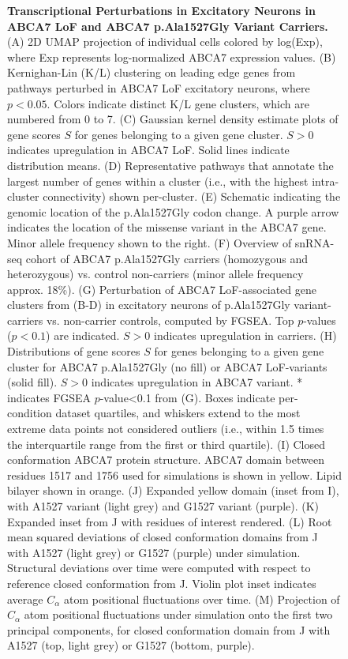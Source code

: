\begin{figure}[ht]
    \centering
    \caption{
        \textbf{Transcriptional Perturbations in Excitatory Neurons in ABCA7 LoF and ABCA7 p.Ala1527Gly Variant Carriers.}\\[1ex]
        (A) 2D UMAP projection of individual cells colored by log(Exp), where Exp represents log-normalized ABCA7 expression values. 
        (B) Kernighan-Lin (K/L) clustering on leading edge genes from pathways perturbed in ABCA7 LoF excitatory neurons, where $p<0.05$. Colors indicate distinct K/L gene clusters, which are numbered from 0 to 7. 
        (C) Gaussian kernel density estimate plots of gene scores $S$ for genes belonging to a given gene cluster. $S>0$ indicates upregulation in ABCA7 LoF. Solid lines indicate distribution means. 
        (D) Representative pathways that annotate the largest number of genes within a cluster (i.e., with the highest intra-cluster connectivity) shown per-cluster. 
        (E) Schematic indicating the genomic location of the p.Ala1527Gly codon change. A purple arrow indicates the location of the missense variant in the ABCA7 gene. Minor allele frequency shown to the right. 
        (F) Overview of snRNA-seq cohort of ABCA7 p.Ala1527Gly carriers (homozygous and heterozygous) vs. control non-carriers (minor allele frequency approx. 18\%). 
        (G) Perturbation of ABCA7 LoF-associated gene clusters from (B-D) in excitatory neurons of p.Ala1527Gly variant-carriers vs. non-carrier controls, computed by FGSEA. Top $p$-values ($p<0.1$) are indicated. $S>0$ indicates upregulation in carriers. 
        (H) Distributions of gene scores $S$ for genes belonging to a given gene cluster for ABCA7 p.Ala1527Gly (no fill) or ABCA7 LoF-variants (solid fill). $S>0$ indicates upregulation in ABCA7 variant. * indicates FGSEA $p$-value<0.1 from (G). Boxes indicate per-condition dataset quartiles, and whiskers extend to the most extreme data points not considered outliers (i.e., within 1.5 times the interquartile range from the first or third quartile). 
        (I) Closed conformation ABCA7 protein structure. ABCA7 domain between residues 1517 and 1756 used for simulations is shown in yellow. Lipid bilayer shown in orange. 
        (J) Expanded yellow domain (inset from I), with A1527 variant (light grey) and G1527 variant (purple). 
        (K) Expanded inset from J with residues of interest rendered. 
        (L) Root mean squared deviations of closed conformation domains from J with A1527 (light grey) or G1527 (purple) under simulation. Structural deviations over time were computed with respect to reference closed conformation from J. Violin plot inset indicates average $C_\alpha$ atom positional fluctuations over time. 
        (M) Projection of $C_\alpha$ atom positional fluctuations under simulation onto the first two principal components, for closed conformation domain from J with A1527 (top, light grey) or G1527 (bottom, purple). 
    }
    \label{fig:main_excitatory}
\end{figure}

